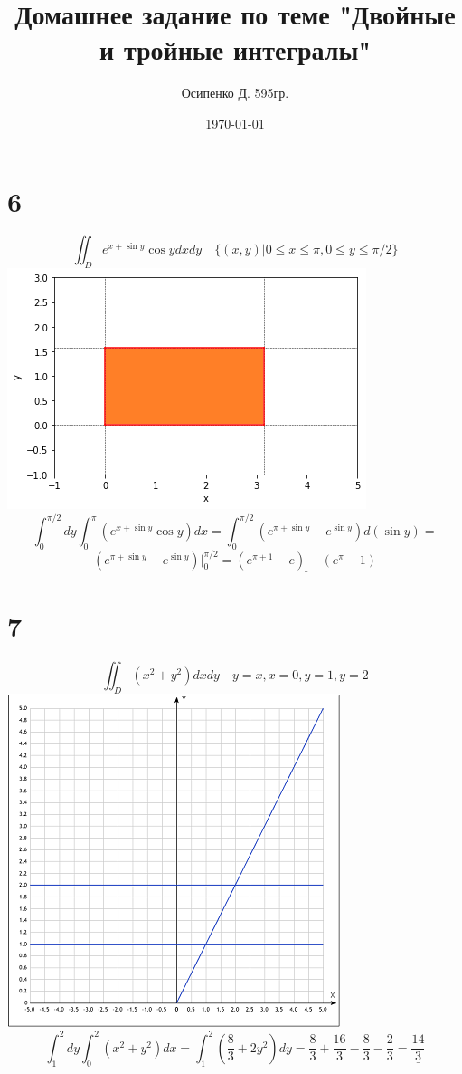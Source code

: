 \documentclass[a4paper, 12pt]{article}
\title{Домашнее задание по теме "Двойные и тройные интегралы"}
\author{Осипенко Д. 595гр.}
\date{\today}
\begin{document}
\sffamily
\maketitle
\section*{6}
\[
	\iint_{D}{e^{ x+\sin y} \cos y dx dy} \quad \{(x,y)|0 \leq x \leq \pi ,0 \leq y \leq \pi/2 \}
\]
\includegraphics{img/index.jpg}\\
\[
		\int_{0}^{\pi/2}dy \int_{0}^{\pi}(e^{ x+\sin y} \cos y)dx =\int_{0}^{\pi/2}(e^{ \pi+\sin y} - e^{\sin y})d(\sin y) =
\]
\[
	(e^{ \pi+\sin y} - e^{\sin y})\big|_{0}^{\pi/2}= \underline{(e^{ \pi+1} - e) - (e^{ \pi} - 1) }
\]
\section*{7}
\[
	\iint_{D}{(x^2+y^2) dx dy} \quad y=x,x=0,y=1,y=2
\]
\includegraphics{img/1.png}
\[
	\int_1^2dy\int_0^2(x^2+y^2)dx = \int_1^2(\frac{8}{3}+2y^2)dy = \frac{8}{3}+\frac{16}{3} - \frac{8}{3}-\frac{2}{3}=\underline{\frac{14}{3}}
\]
\end{document}
